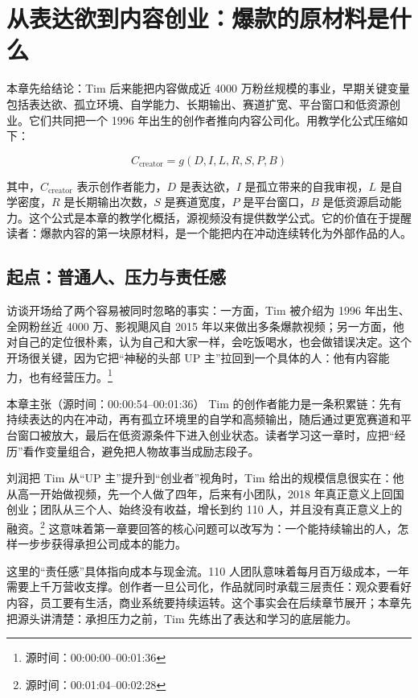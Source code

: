 \section{从表达欲到内容创业：爆款的原材料是什么}

本章先给结论：Tim 后来能把内容做成近 4000 万粉丝规模的事业，早期关键变量包括表达欲、孤立环境、自学能力、长期输出、赛道扩宽、平台窗口和低资源创业。它们共同把一个 1996 年出生的创作者推向内容公司化。用教学化公式压缩如下：

$$
C_{\text{creator}} = g(D, I, L, R, S, P, B)
$$

其中，$C_{\text{creator}}$ 表示创作者能力，$D$ 是表达欲，$I$ 是孤立带来的自我审视，$L$ 是自学密度，$R$ 是长期输出次数，$S$ 是赛道宽度，$P$ 是平台窗口，$B$ 是低资源启动能力。这个公式是本章的教学化概括，源视频没有提供数学公式。它的价值在于提醒读者：爆款内容的第一块原材料，是一个能把内在冲动连续转化为外部作品的人。

\subsection{起点：普通人、压力与责任感}

访谈开场给了两个容易被同时忽略的事实：一方面，Tim 被介绍为 1996 年出生、全网粉丝近 4000 万、影视飓风自 2015 年以来做出多条爆款视频；另一方面，他对自己的定位很朴素，认为自己和大家一样，会吃饭喝水，也会做错误决定。这个开场很关键，因为它把“神秘的头部 UP 主”拉回到一个具体的人：他有内容能力，也有经营压力。\footnote{源时间：00:00:00--00:01:36}

\begin{importantbox}{本章主张（源时间：00:00:54--00:01:36）}
Tim 的创作者能力是一条积累链：先有持续表达的内在冲动，再有孤立环境里的自学和高频输出，随后通过更宽赛道和平台窗口被放大，最后在低资源条件下进入创业状态。读者学习这一章时，应把“经历”看作变量组合，避免把人物故事当成励志段子。
\end{importantbox}

刘润把 Tim 从“UP 主”提升到“创业者”视角时，Tim 给出的规模信息很实在：他从高一开始做视频，先一个人做了四年，后来有小团队，2018 年真正意义上回国创业；团队从三个人、始终没有收益，增长到约 110 人，并且没有真正意义上的融资。\footnote{源时间：00:01:04--00:02:28} 这意味着第一章要回答的核心问题可以改写为：一个能持续输出的人，怎样一步步获得承担公司成本的能力。

这里的“责任感”具体指向成本与现金流。110 人团队意味着每月百万级成本，一年需要上千万营收支撑。创作者一旦公司化，作品就同时承载三层责任：观众要看好内容，员工要有生活，商业系统要持续运转。这个事实会在后续章节展开；本章先把源头讲清楚：承担压力之前，Tim 先练出了表达和学习的底层能力。


